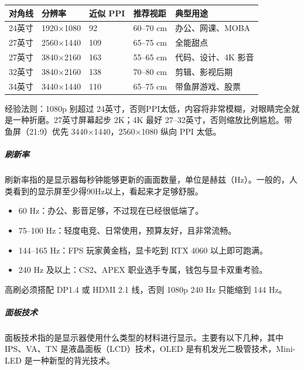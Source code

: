 \begin{table}[ht]
  \centering
  \begin{tabular}{l|l|l|l|l}
    \hline
    对角线 & 分辨率 & 近似 PPI & 推荐视距 & 典型用途 \\
    \hline
    24英寸 & 1920$\times$1080 & 92 & 60–70 cm & 办公、网课、MOBA \\
    27英寸 & 2560$\times$1440 & 109 & 65–75 cm & 全能甜点 \\
    27英寸 & 3840$\times$2160 & 163 & 55–65 cm & 代码、设计、4K 影音 \\
    32英寸 & 3840$\times$2160 & 138 & 70–80 cm & 剪辑、影视后期 \\
    34英寸 & 3440$\times$1440 & 110 & 65–75 cm & 带鱼屏游戏、股票 \\
    \hline
  \end{tabular}
\end{table}

经验法则：1080p 别超过 24英寸，否则PPI太低，内容将非常模糊，对眼睛完全就是一种折磨。27英寸屏幕起步 2K；4K 最好 27–32英寸，否则缩放比例尴尬。带鱼屏（21:9）优先 3440$\times$1440，2560$\times$1080 纵向 PPI 太低。

\subparagraph{刷新率}

刷新率指的是显示器每秒钟能够更新的画面数量，单位是赫兹（Hz）。一般的，人类看到的显示屏至少得90Hz以上，看起来才足够舒服。

\begin{itemize}
  \item 60 Hz：办公、影音足够，不过现在已经很低端了。
  \item 75–100 Hz：轻度电竞、日常使用，预算友好，且非常流畅。
  \item 144–165 Hz：FPS 玩家黄金档，显卡吃到 RTX 4060 以上即可跑满。
  \item 240 Hz 及以上：CS2、APEX 职业选手专属，钱包与显卡双重考验。
\end{itemize}

\begin{caution}
  高刷必须搭配 DP1.4 或 HDMI 2.1 线，否则 1080p 240 Hz 只能缩到 144 Hz。
\end{caution}

\subparagraph{面板技术}

面板技术指的是显示器使用什么类型的材料进行显示。主要有以下几种，其中IPS、VA、TN 是液晶面板（LCD）技术，OLED 是有机发光二极管技术，Mini-LED 是一种新型的背光技术。

